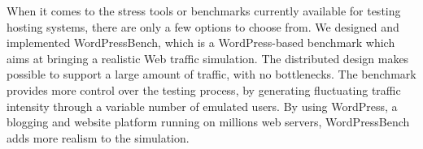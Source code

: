 
When it comes to the stress tools or benchmarks currently available for testing hosting systems, there are only a few options to choose from. We designed and implemented WordPressBench, which is a WordPress-based benchmark which aims at bringing a realistic Web  traffic simulation. The distributed design makes possible to support a large amount of traffic, with no bottlenecks. The benchmark provides more control over the testing process, by generating fluctuating traffic intensity through a variable number of emulated users. By using WordPress, a blogging and website platform running on millions web servers, WordPressBench adds more realism to the simulation.
